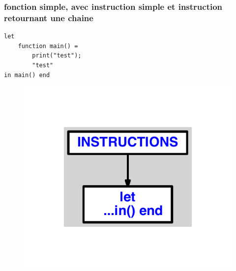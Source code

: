 \documentclass{article}
\begin{document}
\subsubsection{fonction simple, avec instruction simple et instruction retournant une chaine}
\begin{lstlisting}
let
	function main() =
		print("test");
		"test"
in main() end
\end{lstlisting}
\newpage
\begin{figure}[H]
\centering
\includegraphics[max width=\textwidth]{ast/ast_239.pdf}
\end{figure}
\newpage
\end{document}
